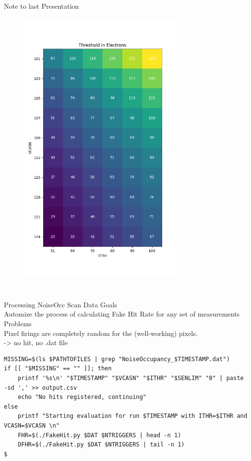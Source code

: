 \begin{frame}{Note to last Presentation}
\begin{minipage}{.49\textwidth}
\begin{figure}[H]
	\includegraphics[width=0.75\textwidth]{bb3_Heatmap_corrected.png}
    \end{figure}
    \end{minipage}\\[.5cm]
\end{frame}

\begin{frame}[fragile]{Processing NoiseOcc Scan Data}
    \Large{Goals}\\
    \normalsize
    Automize the process of calculating Fake Hit Rate for any set of
    measurements\\
    \Large{Problems}\\
    \normalsize
    Pixel firings are completely random for the (well-working) pixels.\\
    -> no hit, no .dat file
    \pause
\begin{lstlisting}
MISSING=$(ls $PATHTOFILES | grep "NoiseOccupancy_$TIMESTAMP.dat")
if [[ "$MISSING" == "" ]]; then
    printf '%s\n' "$TIMESTAMP" "$VCASN" "$ITHR" "$SENLIM" "0" | paste -sd ',' >> output.csv
    echo "No hits registered, continuing"
else
    printf "Starting evaluation for run $TIMESTAMP with ITHR=$ITHR and VCASN=$VCASN \n"
    FHR=$(./FakeHit.py $DAT $NTRIGGERS | head -n 1)
    DFHR=$(./FakeHit.py $DAT $NTRIGGERS | tail -n 1)
$
\end{lstlisting}
\end{frame}

